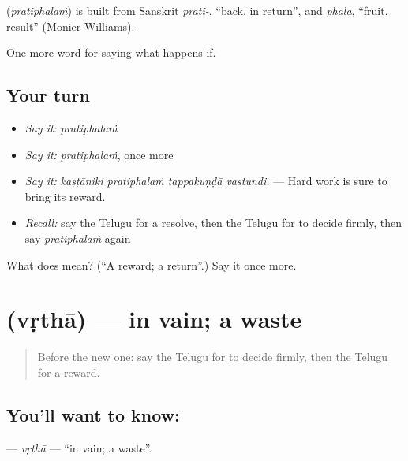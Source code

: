 \begin{cousinweb}
\textbf{} (\emph{pratiphalaṁ}) is built from Sanskrit \emph{prati-}, \textquotedblleft{}back, in return\textquotedblright{}, and \emph{phala}, \textquotedblleft{}fruit, result\textquotedblright{} (Monier-Williams).
\end{cousinweb}

\begin{grammarlens}[title={What you've built}]
One more word for saying what happens if.
\end{grammarlens}

\subsection*{Your turn}
\begin{itemize}
\raggedright
  \item \emph{Say it:} \emph{pratiphalaṁ}
  \item \emph{Say it:} \emph{pratiphalaṁ}, once more
  \item \emph{Say it:} \emph{kaṣṭāniki pratiphalaṁ tappakuṇḍā vastundi.} — Hard work is sure to bring its reward.
  \item \emph{Recall:} say the Telugu for a resolve, then the Telugu for to decide firmly, then say \emph{pratiphalaṁ} again
\end{itemize}

\begin{tcolorbox}[breakable,colback=teal!4,colframe=teal!35!black,title={Before you move on}]
What does  mean? (\textquotedblleft{}A reward; a return\textquotedblright{}.) Say it once more.
\end{tcolorbox}
\section[\texorpdfstring{\te{వృథా} (vṛthā)}{వృథా (vṛthā)}]{ (vṛthā) — in vain; a waste}

\label{lesson:TE-C423-vrtha}



\begin{quote}
Before the new one: say the Telugu for to decide firmly, then the Telugu for a reward.
\end{quote}

\subsection*{You'll want to know: }
\textbf{} — \emph{vṛthā} — \textquotedblleft{}in vain; a waste\textquotedblright{}.

